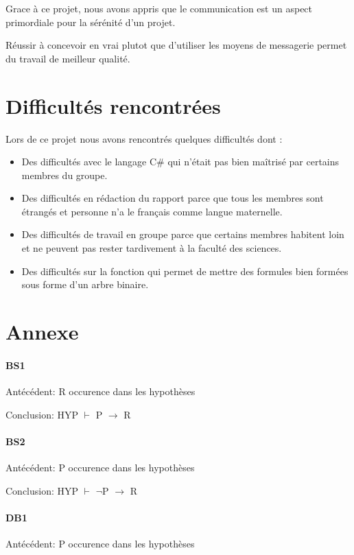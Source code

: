\documentclass[a4paper,12pt]{article}
\begin{document}
Grace à ce projet, nous avons appris que le communication est un aspect primordiale pour la sérénité d'un projet.

Réussir à concevoir en vrai plutot que d'utiliser les moyens de messagerie permet du travail de meilleur qualité.


\section{Difficultés rencontrées}
Lors de ce projet nous avons rencontrés quelques difficultés dont :
\begin{itemize}
 \item Des difficultés avec le langage C# qui n'était pas bien maîtrisé par certains membres du groupe.
 \item Des difficultés en rédaction du rapport parce que tous les membres sont étrangés et personne n'a le français comme langue maternelle.
 \item Des difficultés de travail en groupe parce que certains membres habitent loin et ne peuvent pas rester tardivement à la faculté des sciences.
 \item Des difficultés sur la fonction qui permet de mettre des formules bien formées sous forme d'un arbre binaire.
\end{itemize}



 
\section{Annexe}
\appendix
\paragraph{BS1}
Antécédent:  R occurence dans les hypothèses

Conclusion: HYP $\vdash$ P $\rightarrow$ R

\paragraph{BS2}

Antécédent: P occurence dans les hypothèses

Conclusion: HYP $\vdash$ $\neg$P $\rightarrow$ R

\paragraph{DB1}

Antécédent: P occurence dans les hypothèses
\end{document}
